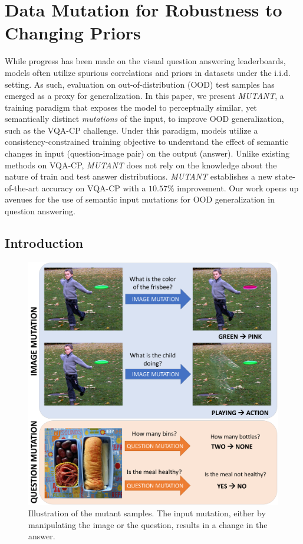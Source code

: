 \chapter{Data Mutation for Robustness to Changing Priors}
\label{chap:mutant}
While progress has been made on the visual question answering leaderboards, models often utilize spurious correlations and priors in datasets under the i.i.d. setting. 
As such, evaluation on out-of-distribution (OOD) test samples has emerged as a proxy for generalization.
In this paper, we present \textit{MUTANT}, a training paradigm that exposes the model to perceptually similar, yet semantically distinct \textit{mutations} of the input, to improve OOD generalization, such as the VQA-CP challenge.
Under this paradigm, models utilize a consistency-constrained training objective to understand the effect of semantic changes in input (question-image pair) on the output (answer).
Unlike existing methods on VQA-CP, \textit{MUTANT} does not rely on the knowledge about the nature of train and test answer distributions.
\textit{MUTANT} establishes a new state-of-the-art accuracy on VQA-CP with a $10.57\%$ improvement.
Our work opens up avenues for the use of semantic input mutations for OOD generalization in question answering.

\section{Introduction}
\begin{figure}
    \centering
    \includegraphics[width=0.8\linewidth]{mutant/figures/teaser.pdf}
    \caption{Illustration of the mutant samples. The input mutation, either by manipulating the image or the question, results in a change in the answer.}
    \label{fig:teaser}
\end{figure}


